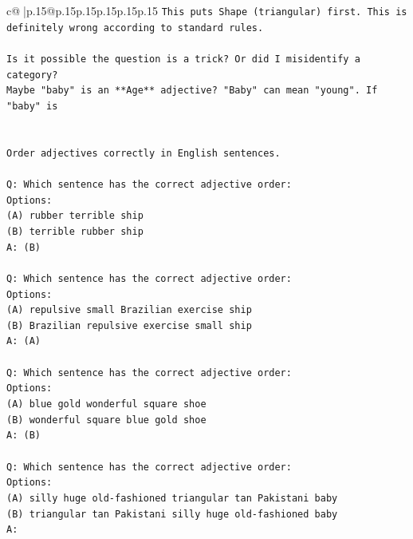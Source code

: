 \documentclass{article}
\begin{document}
{\begin{supertabular}{c@{$\;$}|p{.15\linewidth}@{}p{.15\linewidth}p{.15\linewidth}p{.15\linewidth}p{.15\linewidth}p{.15\linewidth}}
{{{\texttt{This puts Shape (triangular) first. This is definitely wrong according to standard rules.} \\
\\ 
\texttt{Is it possible the question is a trick? Or did I misidentify a category?} \\
\texttt{Maybe "baby" is an **Age** adjective? "Baby" can mean "young". If "baby" is} \\
\\ 
\\ 
\texttt{Order adjectives correctly in English sentences.} \\
\\ 
\texttt{Q: Which sentence has the correct adjective order:} \\
\texttt{Options:} \\
\texttt{(A) rubber terrible ship} \\
\texttt{(B) terrible rubber ship} \\
\texttt{A: (B)} \\
\\ 
\texttt{Q: Which sentence has the correct adjective order:} \\
\texttt{Options:} \\
\texttt{(A) repulsive small Brazilian exercise ship} \\
\texttt{(B) Brazilian repulsive exercise small ship} \\
\texttt{A: (A)} \\
\\ 
\texttt{Q: Which sentence has the correct adjective order:} \\
\texttt{Options:} \\
\texttt{(A) blue gold wonderful square shoe} \\
\texttt{(B) wonderful square blue gold shoe} \\
\texttt{A: (B)} \\
\\ 
\texttt{Q: Which sentence has the correct adjective order:} \\
\texttt{Options:} \\
\texttt{(A) silly huge old{-}fashioned triangular tan Pakistani baby} \\
\texttt{(B) triangular tan Pakistani silly huge old{-}fashioned baby} \\
\texttt{A:} \\
            }
        }
    }
     \\ \\


\end{supertabular}}
\end{document}
